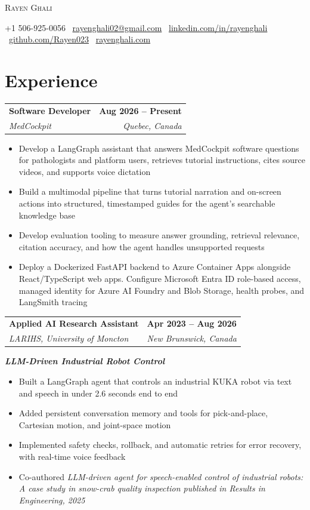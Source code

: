 \documentclass[letterpaper,10pt]{article}
\makeatletter
\newcommand{\resumeItem}[1]{\item #1}
\newcommand{\resumeResearchProjectHeading}[1]{
  \par\addvspace{4pt}\noindent\textbf{\textit{#1}}\par\nopagebreak
}
\newcommand{\resumeSubheading}[4]{
  \par\addvspace{5pt}\noindent
  \begin{tabularx}{\textwidth}{@{}>{\raggedright\arraybackslash}X r@{}}
    \textbf{#1} & \textbf{#2} \\
    \textit{#3} & \textit{#4}
  \end{tabularx}\par\nopagebreak
}
\newcommand{\resumeItemListStart}{\begin{itemize}[label=\textbullet, leftmargin=1.4em, itemsep=1pt, topsep=2pt, parsep=0pt, partopsep=0pt]}
\newcommand{\resumeItemListEnd}{\end{itemize}}
\makeatother
\begin{document}
{\centering
  {\Huge \scshape Rayen Ghali\par}
  \vspace{3pt}
  +1 506-925-0056 \textbar\ \href{mailto:rayenghali02@gmail.com}{rayenghali02@gmail.com} \textbar\ \href{https://linkedin.com/in/rayenghali}{linkedin.com/in/rayenghali} \textbar\ \href{https://github.com/Rayen023}{github.com/Rayen023} \textbar\ \href{https://rayenghali.com}{rayenghali.com}\par
}

\section{Experience}
\resumeSubheading
{Software Developer}{Aug 2026 -- Present}
{MedCockpit}{Quebec, Canada}
\resumeItemListStart
\resumeItem{Develop a LangGraph assistant that answers MedCockpit software questions for pathologists and platform users, retrieves tutorial instructions, cites source videos, and supports voice dictation}
\resumeItem{Build a multimodal pipeline that turns tutorial narration and on-screen actions into structured, timestamped guides for the agent's searchable knowledge base}
\resumeItem{Develop evaluation tooling to measure answer grounding, retrieval relevance, citation accuracy, and how the agent handles unsupported requests}
\resumeItem{Deploy a Dockerized FastAPI backend to Azure Container Apps alongside React/TypeScript web apps. Configure Microsoft Entra ID role-based access, managed identity for Azure AI Foundry and Blob Storage, health probes, and LangSmith tracing}
\resumeItemListEnd

\resumeSubheading
{Applied AI Research Assistant}{Apr 2023 -- Aug 2026}
{LARIHS, University of Moncton}{New Brunswick, Canada}

\resumeResearchProjectHeading{LLM-Driven Industrial Robot Control}
\resumeItemListStart
\resumeItem{Built a LangGraph agent that controls an industrial KUKA robot via text and speech in under 2.6 seconds end to end}
\resumeItem{Added persistent conversation memory and tools for pick-and-place, Cartesian motion, and joint-space motion}
\resumeItem{Implemented safety checks, rollback, and automatic retries for error recovery, with real-time voice feedback}
\resumeItem{Co-authored \textit{LLM-driven agent for speech-enabled control of industrial robots: A case study in snow-crab quality inspection \textup{published in \textit{Results in Engineering}, 2025}}}
\resumeItemListEnd

\end{document}

